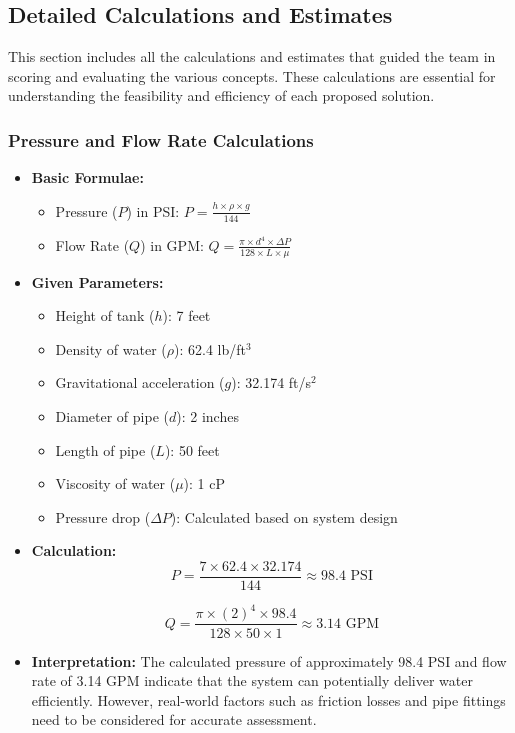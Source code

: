 \documentclass[12pt]{article}
\begin{document}
    \subsection{Detailed Calculations and Estimates}
    This section includes all the calculations and estimates that guided the team in scoring and evaluating the various concepts. These calculations are essential for understanding the feasibility and efficiency of each proposed solution.

    \subsubsection{Pressure and Flow Rate Calculations}
    \begin{itemize}
        \item \textbf{Basic Formulae:}
        \begin{itemize}
            \item Pressure (\(P\)) in PSI: \( P = \frac{h \times \rho \times g}{144} \)
            \item Flow Rate (\(Q\)) in GPM: \( Q = \frac{\pi \times d^4 \times \Delta P}{128 \times L \times \mu} \)
        \end{itemize}
        
        \item \textbf{Given Parameters:}
        \begin{itemize}
            \item Height of tank (\(h\)): 7 feet
            \item Density of water (\(\rho\)): 62.4 lb/ft\(^3\)
            \item Gravitational acceleration (\(g\)): 32.174 ft/s\(^2\)
            \item Diameter of pipe (\(d\)): 2 inches
            \item Length of pipe (\(L\)): 50 feet
            \item Viscosity of water (\(\mu\)): 1 cP
            \item Pressure drop (\(\Delta P\)): Calculated based on system design
        \end{itemize}
        
        \item \textbf{Calculation:}
        \[
        P = \frac{7 \times 62.4 \times 32.174}{144} \approx 98.4 \text{ PSI}
        \]
        
        \[
        Q = \frac{\pi \times (2)^4 \times 98.4}{128 \times 50 \times 1} \approx 3.14 \text{ GPM}
        \]
        
        \item \textbf{Interpretation:}
        The calculated pressure of approximately 98.4 PSI and flow rate of 3.14 GPM indicate that the system can potentially deliver water efficiently. However, real-world factors such as friction losses and pipe fittings need to be considered for accurate assessment.
    \end{itemize}
    
\end{document}
